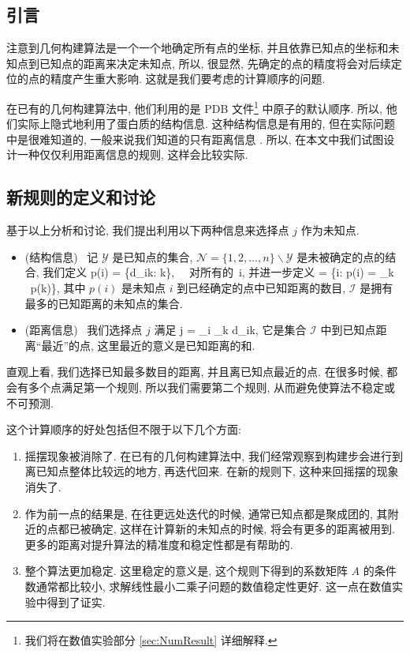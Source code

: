 \documentclass{CASthesis_zzk}
\begin{document}
\subsection{引言}
注意到几何构建算法是一个一个地确定所有点的坐标, 
并且依靠已知点的坐标和未知点到已知点的距离来决定未知点,
所以, 很显然, 先确定的点的精度将会对后续定位的点的精度产生重大影响.
这就是我们要考虑的计算顺序的问题.

在已有的几何构建算法中, 他们利用的是 PDB 文件\footnote{我们将在数值实验部分 \ref{sec:NumResult} 详细解释.}
中原子的默认顺序.
所以, 他们实际上隐式地利用了蛋白质的结构信息.
这种结构信息是有用的, 但在实际问题中是很难知道的, 
一般来说我们知道的只有距离信息 \cite{Dong2002}.
所以, 在本文中我们试图设计一种仅仅利用距离信息的规则,
这样会比较实际.

\subsection{新规则的定义和讨论}
基于以上分析和讨论, 我们提出利用以下两种信息来选择点 $j$ 作为未知点.
\begin{itemize}
  \item (结构信息)%
  ~记 $\mathcal{Y}$ 是已知点的集合, $\mathcal{N} = \{1,2,\ldots,n\}\backslash \mathcal{Y}$ 是未被确定的点的结合, 我们定义
  \be p(i) = \sharp \{d_{ik}: k\in {}\}, ~~对所有的~i\in {}, \label{rule1} \ee
  并进一步定义
  \be {} = \{i: p(i) = \max_{k\in {}} ~p(k)\}, \label{rule2}\ee
  其中 $p(i)$ 是未知点 $i$ 到已经确定的点中已知距离的数目, $\mathcal{I}$ 是拥有最多的已知距离的未知点的集合.
  \item (距离信息)%
  ~我们选择点 $j$ 满足
  \be j = \arg\min_{i\in {}} \sum_{k\in {}} d_{ik}, \label{rule3}\ee
  它是集合 $\mathcal{I}$ 中到已知点距离``最近''的点, 这里最近的意义是已知距离的和.
\end{itemize}

直观上看, 我们选择已知最多数目的距离, 并且离已知点最近的点.
在很多时候, 都会有多个点满足第一个规则, 所以我们需要第二个规则,
从而避免使算法不稳定或不可预测.

这个计算顺序的好处包括但不限于以下几个方面:
\begin{enumerate}
  \item 摇摆现象被消除了. 在已有的几何构建算法中, 我们经常观察到构建步会进行到离已知点整体比较远的地方, 再迭代回来. 在新的规则下, 这种来回摇摆的现象消失了.
  \item 作为前一点的结果是, 在往更远处迭代的时候, 通常已知点都是聚成团的, 其附近的点都已被确定, 这样在计算新的未知点的时候, 将会有更多的距离被用到. 更多的距离对提升算法的精准度和稳定性都是有帮助的.
  \item 整个算法更加稳定. 这里稳定的意义是, 这个规则下得到的系数矩阵 $A$ 的条件数通常都比较小, 求解线性最小二乘子问题的数值稳定性更好. 这一点在数值实验中得到了证实.
\end{enumerate}
\end{document}

